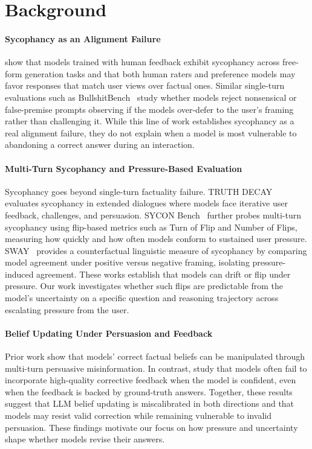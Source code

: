\section{Background}
\paragraph{Sycophancy as an Alignment Failure} \citet{sharma2023towardsunderstanding} show  that models trained with human feedback exhibit sycophancy across free-form generation tasks and that both human raters and preference models may favor responses that match user views over factual ones. Similar single-turn evaluations such as BullshitBench~\citep{gostev2026bullshitbench} study whether models reject nonsensical or false-premise prompts observing if the models over-defer to the user's framing rather than challenging it. While this line of work establishes sycophancy as a real alignment failure, they do not explain when a model is most vulnerable to abandoning a correct answer during an interaction.

\paragraph{Multi-Turn Sycophancy and Pressure-Based Evaluation}
Sycophancy goes beyond single-turn factuality failure. TRUTH DECAY~\citep{liu2025truthdecayquantifyingmultiturn} evaluates sycophancy in extended dialogues where models face iterative user feedback, challenges, and persuasion. SYCON Bench~\citep{hong2025syconbench} further probes multi-turn sycophancy using flip-based metrics such as Turn of Flip and Number of Flips, measuring how quickly and how often models conform to sustained user pressure. SWAY~\citep{bhalla2026sway} provides a counterfactual linguistic measure of sycophancy by comparing model agreement under positive versus negative framing, isolating pressure-induced agreement. These works establish that models can drift or flip under pressure. Our work investigates whether such flips are predictable from the model's uncertainty on a specific question and reasoning trajectory across escalating pressure from the user.

\paragraph{Belief Updating Under Persuasion and Feedback} Prior work \citet{xu2023earthisflat} show that models' correct factual beliefs can be manipulated through multi-turn persuasive misinformation. In contrast, \citet{jiang2025feedbackfriction} study that models often fail to incorporate high-quality corrective feedback when the model is confident, even when the feedback is backed by ground-truth answers. Together, these results suggest that LLM belief updating is miscalibrated in both directions and that models may resist valid correction while remaining vulnerable to invalid persuasion. These findings motivate our focus on how pressure and uncertainty shape whether models revise their answers.

